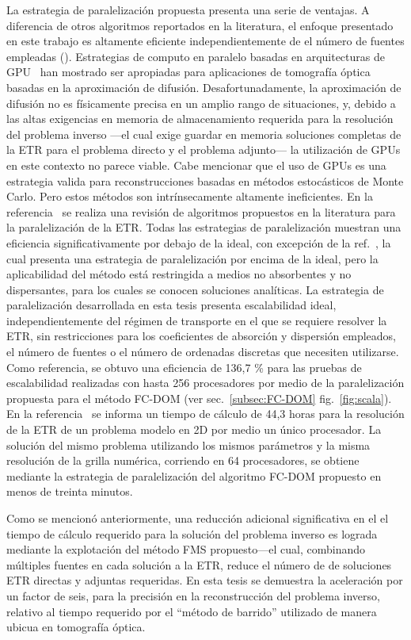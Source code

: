 La estrategia de paralelización propuesta presenta una serie de
ventajas. A diferencia de otros algoritmos reportados en la literatura, el enfoque
presentado en este trabajo es altamente eficiente independientemente de
el número de fuentes empleadas (\cf \cite{Hielscher2004}).
Estrategias de computo en paralelo basadas en arquitecturas de GPU~\cite {Doulgerakis2017} han mostrado ser apropiadas para aplicaciones de tomografía óptica basadas en la aproximación de difusión. Desafortunadamente, 
la aproximación de difusión no es físicamente precisa en un amplio rango de situaciones,
y, debido a las altas exigencias en memoria de almacenamiento requerida para 
la resolución del problema inverso ---el cual exige guardar en memoria soluciones completas 
de la ETR para el problema 
directo y el problema adjunto--- la utilización de GPUs en este contexto no parece viable. 
Cabe mencionar que el uso de GPUs es una estrategia valida para reconstrucciones 
basadas en métodos estocásticos de Monte Carlo. Pero estos métodos son intrínsecamente 
altamente ineficientes. En la 
referencia~\cite{Coelho2014} se realiza una revisión de algoritmos propuestos en la literatura 
para la paralelización de la ETR. Todas las estrategias de paralelización muestran una eficiencia significativamente por debajo de la ideal, con excepción de la ref.~\cite {Colomer2013}, la cual presenta una estrategia de paralelización 
por encima de la ideal, pero
la aplicabilidad del método está restringida a medios no absorbentes y no dispersantes, 
para los cuales se conocen soluciones analíticas. La estrategia de paralelización 
desarrollada en esta tesis presenta escalabilidad ideal, independientemente 
del régimen de transporte en el que se requiere resolver la ETR, sin restricciones 
para los coeficientes de absorción y dispersión empleados, el número de fuentes o el número de ordenadas discretas que necesiten utilizarse. Como referencia, se obtuvo una eficiencia de 136,7 \% para las pruebas de escalabilidad realizadas con hasta 256 procesadores por
medio de la paralelización propuesta para el método FC-DOM (ver sec.~\ref{subsec:FC-DOM} fig.~\ref{fig:scala}). En la referencia~\cite [p. 153]{Fujii2014} 
se informa un tiempo de cálculo de 44,3 horas para la resolución de la ETR de un problema modelo 
en 2D por medio un único procesador. La solución del mismo problema utilizando 
los mismos parámetros y la misma resolución de la grilla numérica, corriendo en 64 procesadores, se obtiene mediante la estrategia de paralelización del algoritmo FC-DOM propuesto en menos de treinta minutos.

Como se mencionó anteriormente, una reducción adicional significativa en el
el tiempo de cálculo requerido para la solución del problema inverso es
lograda mediante la explotación del método FMS propuesto---el cual, combinando
múltiples fuentes en cada solución a la ETR, reduce el número de
de soluciones ETR directas y adjuntas requeridas. 
En esta tesis se demuestra la aceleración por un factor de seis, 
para la precisión en la reconstrucción del problema inverso,
relativo al tiempo requerido por el ``método de barrido'' 
utilizado de manera ubicua en tomografía óptica.

